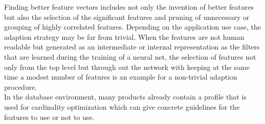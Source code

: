 Finding better feature vectors includes not only the invention of better features but also the selection of the significant features and pruning of unnecessary or grouping of highly correlated features. Depending on the application use case, the adaption strategy may be far from trivial. When the features are not human readable but generated as an intermediate or internal representation as the filters that are learned during the training of a neural net, the selection of features not only from the top level but through out the network with keeping at the same time a modest number of features is an example for a non-trivial adaption procedure. \\
In the database environment, many products already contain a profile that is used for cardinality optimization which can give concrete guidelines for the features to use or not to use. \\

